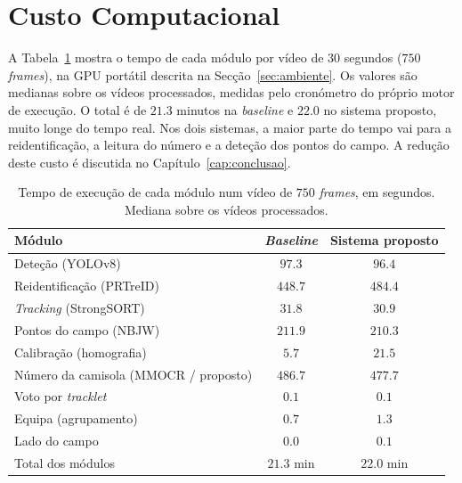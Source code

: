 \section{Custo Computacional}\label{sec:res_tempos}

A Tabela~\ref{tab:tempos} mostra o tempo de cada módulo por vídeo de $30$ segundos ($750$ \emph{frames}), na GPU portátil descrita na Secção~\ref{sec:ambiente}. Os valores são medianas sobre os vídeos processados, medidas pelo cronómetro do próprio motor de execução. O total é de $21.3$ minutos na \emph{baseline} e $22.0$ no sistema proposto, muito longe do tempo real. Nos dois sistemas, a maior parte do tempo vai para a reidentificação, a leitura do número e a deteção dos pontos do campo. A redução deste custo é discutida no Capítulo~\ref{cap:conclusao}.

\begin{table}[htbp]
    \centering
    \caption{Tempo de execução de cada módulo num vídeo de $750$ \emph{frames}, em segundos. Mediana sobre os vídeos processados.}
    \label{tab:tempos}
    \begin{tabular}{|l|c|c|}
        \hline
        \textbf{Módulo} & \textbf{\emph{Baseline}} & \textbf{Sistema proposto} \\
        \hline
        Deteção (YOLOv8)                          & $97.3$  & $96.4$ \\
        \hline
        Reidentificação (PRTreID)                 & $448.7$ & $484.4$ \\
        \hline
        \emph{Tracking} (StrongSORT)              & $31.8$  & $30.9$ \\
        \hline
        Pontos do campo (NBJW)                    & $211.9$ & $210.3$ \\
        \hline
        Calibração (homografia)                   & $5.7$   & $21.5$ \\
        \hline
        Número da camisola (MMOCR / proposto)     & $486.7$ & $477.7$ \\
        \hline
        Voto por \emph{tracklet}                  & $0.1$   & $0.1$ \\
        \hline
        Equipa (agrupamento)                      & $0.7$   & $1.3$ \\
        \hline
        Lado do campo                             & $0.0$   & $0.1$ \\
        \hline
        Total dos módulos                         & $21.3$ min & $22.0$ min \\
        \hline
    \end{tabular}
\end{table}

